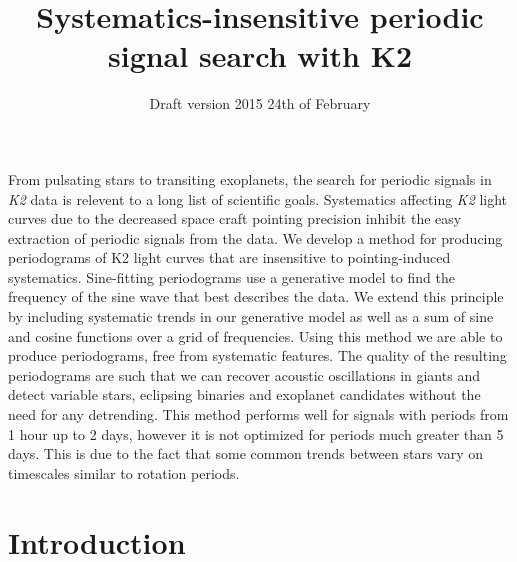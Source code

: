 \documentclass[useAMS, usenatbib]{aastex}
\title{Systematics-insensitive periodic signal search with K2}
\begin{document}
\date{Draft version 2015 24th of February}
\maketitle

From pulsating stars to transiting exoplanets, the search for periodic signals
in {\it K2} data is relevent to a long list of scientific goals.
Systematics affecting {\it K2} light curves due to the decreased
space craft pointing precision inhibit the easy extraction of periodic signals
from the data.
We develop a method for producing periodograms of K2 light curves that
are insensitive to pointing-induced systematics.
Sine-fitting periodograms use a generative model to find the frequency
of the sine wave that best describes the data.
We extend this principle by including systematic trends in our generative
model as well as a sum of sine and cosine functions over a grid of
frequencies.
Using this method we are able to produce periodograms, free from
systematic features.
The quality of the resulting periodograms are such that we can recover acoustic oscillations in giants and detect variable stars, eclipsing binaries and exoplanet
candidates without the need for any detrending.
This method performs well for signals with periods from 1 hour up to 2 days,
however it is not optimized for periods much greater than 5 days.
This is due to the fact that some common trends between stars vary on
timescales similar to rotation periods.

\section{Introduction}
\label{Introduction}
\end{document}

